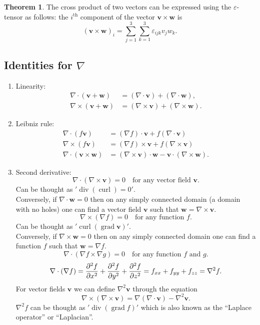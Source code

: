 \documentclass[12pt, a4paper]{article}
\newcommand{\mb}[1]{\mathbf{#1}}
\DeclareMathOperator{\Div}{div}
\DeclareMathOperator{\Curl}{curl}
\DeclareMathOperator{\Grad}{grad}
\theoremstyle{definition}
\newtheorem{theorem}{Theorem}[section]
\theoremstyle{plain}
\begin{document}
\begin{theorem}
The cross product of two vectors can be expressed using the $\varepsilon$-tensor as follows: the $i^{\text{th}}$ component of the vector $\mb{v \times w}$ is $$(\mb{v\times w})_i=\sum_{j=1}^{3} \sum_{k=1}^{3} \varepsilon_{ijk}v_jw_k.$$
\end{theorem}

\subsection{Identities for \texorpdfstring{$\nabla$}{TEXT}}

\begin{enumerate}
	\item Linearity: $$\begin{aligned}\nabla \cdot (\mb{v+w})&=(\nabla\cdot\mb{v})+(\nabla\cdot\mb{w}), \\
	\nabla \times (\mb{v+w})&=(\nabla\times\mb{v})+(\nabla\times\mb{w}).\end{aligned}$$

	\item Leibniz rule: $$\begin{aligned}
	\nabla\cdot(f\mb{v})&=(\nabla f)\cdot \mb{v}+f(\nabla \cdot \mb{v})\\
	\nabla\times(f\mb{v})&=(\nabla f)\times \mb{v}+f(\nabla \times \mb{v})\\
	\nabla\cdot(\mb{v\times w})&=(\nabla\times\mb{v})\cdot\mb{w}-\mb{v}\cdot(\nabla\times\mb{w}).
	\end{aligned}$$

	\item Second derivative: $$\nabla\cdot(\nabla\times\mb{v})=0 \quad \text{for any vector field } \mb{v}.$$ Can be thought as $'\Div{(\Curl)=0'.}$ \\ Conversely, if $\nabla\cdot\mb{w}=0$ then on any simply connected domain (a domain with no holes) one can find a vector field $\mb{v}$ such that $\mb{w}=\nabla\times\mb{v}.$ 
	$$\nabla\times(\nabla f)=0 \quad \text{for any function }f.$$ Can be thought as $'\Curl{(\Grad{\mb{v}})}'.$ \\ Conversely, if $\nabla\times\mb{w}=0$ then on any simply connected domain one can find a function $f$ such that $\mb{w}=\nabla f.$
	$$\nabla\cdot(\nabla f \times \nabla g)=0\quad \text{for any function $f$ and $g$}.$$
	$$\nabla\cdot(\nabla f)=\pdv[2]{f}{x}+\pdv[2]{f}{y}+\pdv[2]{f}{z}=f_{xx}+f_{yy}+f_{zz}=\nabla^2f.$$
	For vector fields $\mb{v}$ we can define $\nabla^2\mb{v}$ through the equation $$\nabla\times(\nabla\times\mb{v})=\nabla(\nabla\cdot \mb{v})-\nabla^2\mb{v}.$$ $\nabla^2f$ can be thought as $'\Div{(\Grad{f})}'$ which is also known as the ``Laplace operator'' or ``Laplacian''.

\end{enumerate}
\end{document}
